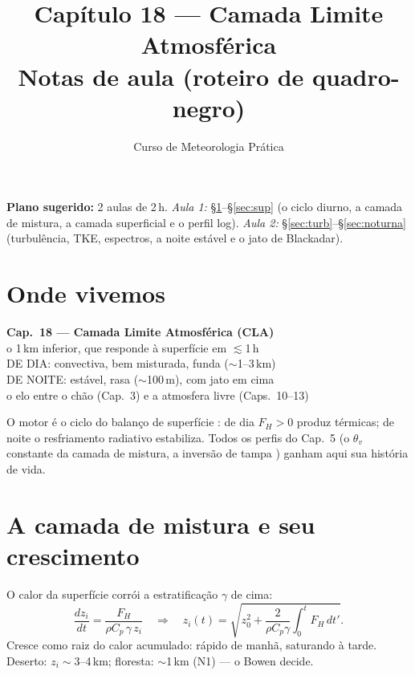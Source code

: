 \documentclass[11pt]{article}
\title{Capítulo 18 --- Camada Limite Atmosférica\\
{\large Notas de aula (roteiro de quadro-negro)}}
\author{Curso de Meteorologia Prática}
\date{}
\begin{document}
\maketitle
\thispagestyle{fancy}

\noindent\textbf{Plano sugerido:} 2 aulas de 2\,h.
\emph{Aula 1:} \S\ref{sec:ciclo}--\S\ref{sec:sup} (o ciclo diurno, a
camada de mistura, a camada superficial e o perfil log).
\emph{Aula 2:} \S\ref{sec:turb}--\S\ref{sec:noturna} (turbulência, TKE,
espectros, a noite estável e o jato de Blackadar).

\section{Onde vivemos}\label{sec:ciclo}

\begin{noquadro}[abertura]
\textbf{Cap.~18 --- Camada Limite Atmosférica (CLA)}\\[2pt]
o 1\,km inferior, que responde à superfície em $\lesssim$1\,h
\\
DE DIA: convectiva, bem misturada, funda ($\sim$1--3\,km)\\
DE NOITE: estável, rasa ($\sim$100\,m), com jato em cima\\[2pt]
o elo entre o chão (Cap.~3) e a atmosfera livre (Caps.~10--13)
\end{noquadro}


O motor é o ciclo do balanço de superfície :
de dia $F_H>0$ produz térmicas; de noite o resfriamento radiativo
 estabiliza. Todos os perfis do Cap.~5 (o
$\theta_v$ constante da camada de mistura, a inversão de tampa
) ganham aqui sua história de vida.

\section{A camada de mistura e seu crescimento}\label{sec:mistura}

\begin{formadif}
O calor da superfície corrói a estratificação $\gamma$ de cima:
\[ \frac{dz_i}{dt} = \frac{F_H}{\rho C_p\,\gamma\,z_i}
\quad\Rightarrow\quad
z_i(t) = \sqrt{z_0^2 + \frac{2}{\rho C_p\gamma}\int_0^t F_H\,dt'}. \]
Cresce como raiz do calor acumulado: rápido de manhã, saturando à
tarde. Deserto: $z_i \sim 3$--4\,km; floresta: $\sim$1\,km (N1) — o
Bowen  decide.
\end{formadif}
\end{document}
